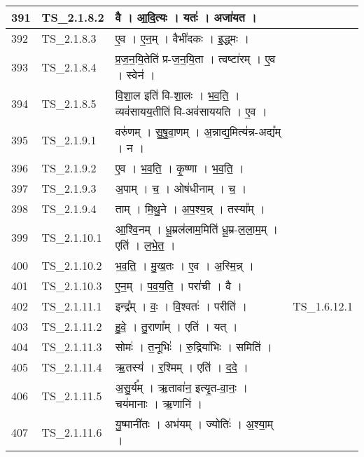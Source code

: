\documentclass[17pt]{extarticle}
\begin{document}
\begin{longtable}{||p{0.4in}||p{0.9in}||p{4.0in}||p{0.9in}||}
            391 & TS\_2.1.8.2 & वै   ।   आ॒दि॒त्यः   ।   यतः॑   ।   अजा॑यत   ।    &      \\
        \hline
            392 & TS\_2.1.8.3 & ए॒व   ।   ए॒न॒म्   ।   वैभी॑दकः   ।   इ॒द्ध्मः   ।    &      \\
        \hline
            393 & TS\_2.1.8.4 & प्र॒ज॒न॒यि॒तेति॑ प्र{-}ज॒न॒यि॒ता   ।   त्वष्टा॑रम्   ।   ए॒व   ।   स्वेन॑   ।    &      \\
        \hline
            394 & TS\_2.1.8.5 & वि॒शा॒ल इति॑ वि{-}शा॒लः   ।   भ॒व॒ति॒   ।   व्यव॑सायय॒तीति॑ वि{-}अव॑साययति   ।   ए॒व   ।    &      \\
        \hline
            395 & TS\_2.1.9.1 & वरु॑णम्   ।   सु॒षु॒वा॒णम्   ।   अ॒न्नाद्य॒मित्य॑न्न{-}अद्य᳚म्   ।   न   ।    &      \\
        \hline
            396 & TS\_2.1.9.2 & ए॒व   ।   भ॒व॒ति॒   ।   कृ॒ष्णा   ।   भ॒व॒ति॒   ।    &      \\
        \hline
            397 & TS\_2.1.9.3 & अ॒पाम्   ।   च॒   ।   ओष॑धीनाम्   ।   च॒   ।    &      \\
        \hline
            398 & TS\_2.1.9.4 & ताम्   ।   मि॒थु॒ने   ।   अ॒प॒श्य॒न्न्   ।   तस्या᳚म्   ।    &      \\
        \hline
            399 & TS\_2.1.10.1 & आ॒श्वि॒नम्   ।   धू॒म्रल॑लाम॒मिति॑ धू॒म्र{-}ल॒ला॒म॒म्   ।   एति॑   ।   ल॒भे॒त॒   ।    &      \\
        \hline
            400 & TS\_2.1.10.2 & भ॒व॒ति॒   ।   मु॒ख॒तः   ।   ए॒व   ।   अ॒स्मि॒न्न्   ।    &      \\
        \hline
            401 & TS\_2.1.10.3 & ए॒न॒म्   ।   प॒व॒य॒ति॒   ।   परा॑ची   ।   वै   ।    &      \\
        \hline
            402 & TS\_2.1.11.1 & इन्द्र᳚म्   ।   वः॒   ।   वि॒श्वतः॑   ।   परीति॑   ।    & TS\_1.6.12.1        \\
        \hline
            403 & TS\_2.1.11.2 & हु॒वे॒   ।   तु॒राणा᳚म्   ।   एति॑   ।   यत्   ।    &      \\
        \hline
            404 & TS\_2.1.11.3 & सोमः॑   ।   त॒नूभिः॑   ।   रु॒द्रिया॑भिः   ।   समिति॑   ।    &      \\
        \hline
            405 & TS\_2.1.11.4 & ऋ॒तस्य॑   ।   र॒श्मिम्   ।   एति॑   ।   द॒दे॒   ।    &      \\
        \hline
            406 & TS\_2.1.11.5 & अ॒सु॒र्य᳚म्   ।   ऋ॒तावा॑न॒ इत्यृ॒त{-}वा॒नः॒   ।   चय॑मानाः   ।   ऋ॒णानि॑   ।    &      \\
        \hline
            407 & TS\_2.1.11.6 & यु॒ष्मानी॑तः   ।   अभ॑यम्   ।   ज्योतिः॑   ।   अ॒श्या॒म्   ।    &      \\

\end{longtable}
\end{document}
